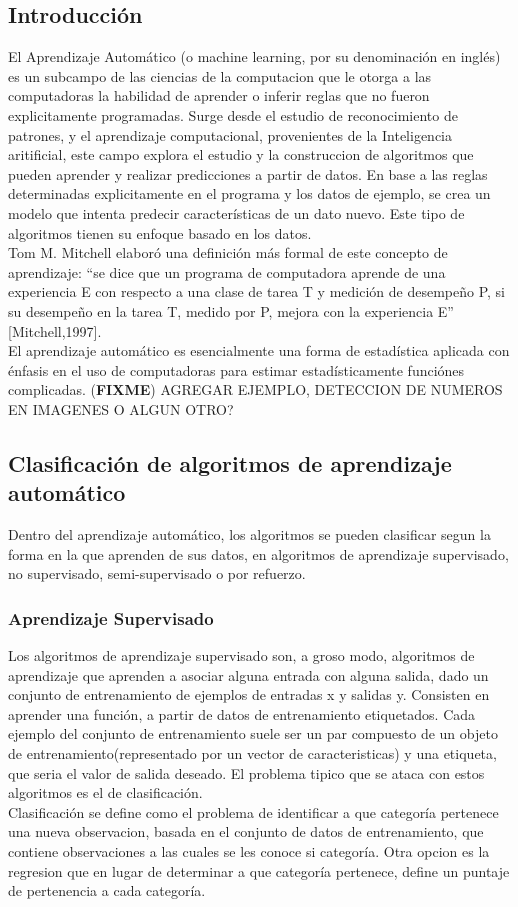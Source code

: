 \documentclass[a4paper,11pt,spanish]{book}
\newcommand*{\FIXME}[1]{{(\textbf{FIXME}) {#1}}}
\begin{document}
    \subsection{Introducción}
      El Aprendizaje Automático (o machine learning, por su denominación en inglés) es un subcampo de las ciencias de la computacion que le otorga a las computadoras la habilidad de aprender o inferir reglas que no fueron explicitamente programadas.
      Surge desde el estudio de reconocimiento de patrones, y el aprendizaje computacional, provenientes de la Inteligencia aritificial, este campo explora el estudio y la construccion de algoritmos
      que pueden aprender y realizar predicciones a partir de datos. En base a las reglas determinadas explicitamente en el programa y los datos de ejemplo, se crea un modelo que intenta predecir
      características de un dato nuevo. Este tipo de algoritmos tienen su enfoque basado en los datos.\\
      Tom M. Mitchell elaboró una definición más formal de este concepto de aprendizaje: “se dice que un programa de computadora aprende de una experiencia E con respecto a una clase 
      de tarea T y medición de desempeño P, si su desempeño en la tarea T, medido por P, mejora con la experiencia E” [Mitchell,1997].\\
      El aprendizaje automático es esencialmente una forma de estadística aplicada con énfasis en el uso de computadoras para estimar estadísticamente funciónes complicadas.
      \FIXME{AGREGAR EJEMPLO, DETECCION DE NUMEROS EN IMAGENES O ALGUN OTRO?}

    \subsection{Clasificación de algoritmos de aprendizaje automático}
      Dentro del aprendizaje automático, los algoritmos se pueden clasificar segun la forma en la que aprenden de sus datos, en algoritmos de aprendizaje supervisado, no supervisado, 
      semi-supervisado o por refuerzo.

      \subsubsection{Aprendizaje Supervisado}
	Los algoritmos de aprendizaje supervisado son, a groso modo, algoritmos de aprendizaje que aprenden a asociar alguna entrada con alguna salida, 
	dado un conjunto de entrenamiento de ejemplos de entradas x y salidas y.
	Consisten en aprender una función, a partir de datos de entrenamiento etiquetados. Cada ejemplo del conjunto de entrenamiento suele ser un par
	compuesto de un objeto de entrenamiento(representado por un vector de caracteristicas) y una etiqueta, que seria el valor de salida deseado.
	El problema tipico que se ataca con estos algoritmos es el de clasificación. \\
	Clasificación se define como el problema de identificar a que categoría pertenece una nueva observacion,
	basada en el conjunto de datos de entrenamiento, que contiene observaciones a las cuales se les conoce si categoría.
	Otra opcion es la regresion que en lugar de determinar a que categoría pertenece, define un puntaje de pertenencia a cada categoría.
	
\end{document}
